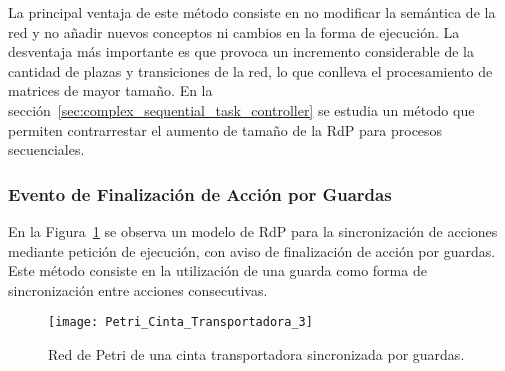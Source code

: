 La principal ventaja de este método consiste en no modificar la semántica de
la red y no añadir nuevos conceptos ni cambios en la forma de ejecución.
La desventaja más importante es que provoca un incremento considerable de
la cantidad de plazas y transiciones de la red, lo que conlleva el
procesamiento de matrices de mayor tamaño. En la
sección~\ref{sec:complex_sequential_task_controller} se estudia un método que
permiten contrarrestar el aumento de tamaño de la RdP para procesos
secuenciales.

\subsubsection{Evento de Finalización de Acción por Guardas}
En la Figura~\ref{fig:petri_cinta_transportadora_3} se observa un modelo de
RdP para la sincronización de acciones mediante petición de ejecución, con aviso
de finalización de acción por guardas. Este método consiste en la utilización de
una guarda como forma de sincronización entre acciones consecutivas.

\begin{figure}[H]
    \centering
    \texttt{[image: Petri\_Cinta\_Transportadora\_3]}
    \caption{Red de Petri de una cinta transportadora sincronizada por guardas.}
    \label{fig:petri_cinta_transportadora_3}
\end{figure}

